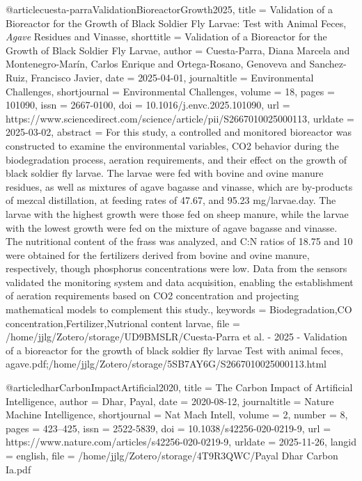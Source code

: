 {{{@article{cuesta-parraValidationBioreactorGrowth2025,
  title = {Validation of a Bioreactor for the Growth of Black Soldier Fly Larvae: {{Test}} with Animal Feces, {\mkbibemph{Agave}} Residues and Vinasse},
  shorttitle = {Validation of a Bioreactor for the Growth of Black Soldier Fly Larvae},
  author = {Cuesta-Parra, Diana Marcela and Montenegro-Marín, Carlos Enrique and Ortega-Rosano, Genoveva and Sanchez-Ruiz, Francisco Javier},
  date = {2025-04-01},
  journaltitle = {Environmental Challenges},
  shortjournal = {Environmental Challenges},
  volume = {18},
  pages = {101090},
  issn = {2667-0100},
  doi = {10.1016/j.envc.2025.101090},
  url = {https://www.sciencedirect.com/science/article/pii/S2667010025000113},
  urldate = {2025-03-02},
  abstract = {For this study, a controlled and monitored bioreactor was constructed to examine the environmental variables, CO2 behavior during the biodegradation process, aeration requirements, and their effect on the growth of black soldier fly larvae. The larvae were fed with bovine and ovine manure residues, as well as mixtures of agave bagasse and vinasse, which are by-products of mezcal distillation, at feeding rates of 47.67, and 95.23 mg/larvae.day. The larvae with the highest growth were those fed on sheep manure, while the larvae with the lowest growth were fed on the mixture of agave bagasse and vinasse. The nutritional content of the frass was analyzed, and C:N ratios of 18.75 and 10 were obtained for the fertilizers derived from bovine and ovine manure, respectively, though phosphorus concentrations were low. Data from the sensors validated the monitoring system and data acquisition, enabling the establishment of aeration requirements based on CO2 concentration and projecting mathematical models to complement this study.},
  keywords = {Biodegradation,CO concentration,Fertilizer,Nutrional content larvae},
  file = {/home/jjlg/Zotero/storage/UD9BMSLR/Cuesta-Parra et al. - 2025 - Validation of a bioreactor for the growth of black soldier fly larvae Test with animal feces, agave.pdf;/home/jjlg/Zotero/storage/5SB7AY6G/S2667010025000113.html}
}

@article{dharCarbonImpactArtificial2020,
  title = {The Carbon Impact of Artificial Intelligence},
  author = {Dhar, Payal},
  date = {2020-08-12},
  journaltitle = {Nature Machine Intelligence},
  shortjournal = {Nat Mach Intell},
  volume = {2},
  number = {8},
  pages = {423--425},
  issn = {2522-5839},
  doi = {10.1038/s42256-020-0219-9},
  url = {https://www.nature.com/articles/s42256-020-0219-9},
  urldate = {2025-11-26},
  langid = {english},
  file = {/home/jjlg/Zotero/storage/4T9R3QWC/Payal Dhar Carbon Ia.pdf}
}

}}}

